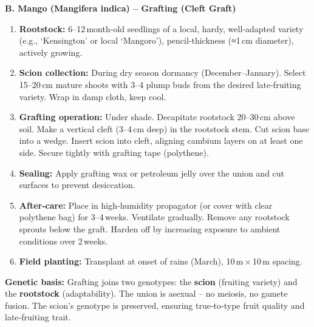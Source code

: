 \documentclass[11pt]{article}
\newcommand{\cle}[1]{{\popxbold\color{popdark}#1}}
\begin{document}
\begin{exemplebox}
\textbf{B. Mango (Mangifera indica) – Grafting (Cleft Graft)}
\begin{methode}
\begin{enumerate}
\item \textbf{Rootstock:} 6–12 month‑old seedlings of a local, hardy, well‑adapted variety (e.g., ‘Kensington’ or local ‘Mangoro’), pencil‑thickness (≈1 cm diameter), actively growing.
\item \textbf{Scion collection:} During dry season dormancy (December–January). Select 15–20 cm mature shoots with 3–4 plump buds from the desired late‑fruiting variety. Wrap in damp cloth, keep cool.
\item \textbf{Grafting operation:} Under shade. Decapitate rootstock 20–30 cm above soil. Make a vertical cleft (3–4 cm deep) in the rootstock stem. Cut scion base into a wedge. Insert scion into cleft, aligning \cle{cambium} layers on at least one side. Secure tightly with grafting tape (polythene).
\item \textbf{Sealing:} Apply grafting wax or petroleum jelly over the union and cut surfaces to prevent desiccation.
\item \textbf{After‑care:} Place in high‑humidity propagator (or cover with clear polythene bag) for 3–4 weeks. Ventilate gradually. Remove any rootstock sprouts below the graft. Harden off by increasing exposure to ambient conditions over 2 weeks.
\item \textbf{Field planting:} Transplant at onset of rains (March), 10 m × 10 m spacing.
\end{enumerate}
\end{methode}
\textbf{Genetic basis:} Grafting joins two genotypes: the \textbf{scion} (fruiting variety) and the \textbf{rootstock} (adaptability). The union is \cle{asexual} – no meiosis, no gamete fusion. The scion’s genotype is preserved, ensuring true‑to‑type fruit quality and late‑fruiting trait.
\end{exemplebox}
\end{document}
